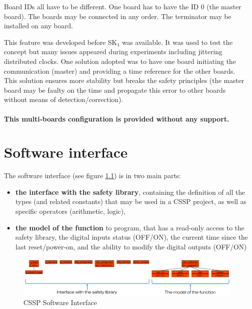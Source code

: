 Board IDs all have to be different. One board has to have the ID 0 (the master board). The boards may be connected in any order. The terminator may be installed on any board.

This feature was developed before SK$_1$ was available. It was used to test the concept but many issues appeared during experiments including jittering distributed clocks. One solution adopted was to have one board initiating the communication (master) and providing a time reference for the other boards. This solution ensures more stability but breaks the safety principles (the master board may be faulty on the time and propagate this error to other boards without means of detection/correction). \\\\
\textbf{\color{ocre}This multi-boards configuration is provided without any support.} 



\chapter{Software interface}

The software interface (see figure \ref{annexes:CSSP-SW-interface}) is in two main parts:
\begin{itemize}
    \item \textbf{the interface with the safety library}, containing the definition of all the types (and related constants) that may be used in a CSSP project, as well as specific operators (arithmetic, logic),
    \item \textbf{the model of the function} to program, that has a read-only access to the safety library, the digital inputs status (OFF/ON), the current time since the last reset/power-on, and the ability to modify the digital outputs (OFF/ON)
\end{itemize}
\begin{figure}[h]
\centering\includegraphics[scale=0.25]{Pictures/chapterAnnexes/sw-interface.png}
\caption{CSSP Software Interface}
\label{annexes:CSSP-SW-interface}
\end{figure}

